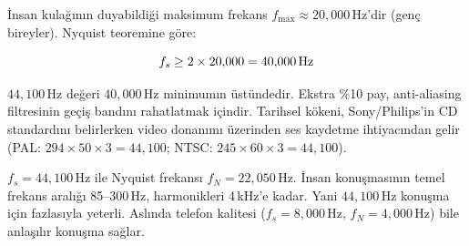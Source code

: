 \.{I}nsan kula\u{g}{\i}n{\i}n duyabildi\u{g}i maksimum frekans $f_{\max} \approx 20{,}000$\,Hz'dir (gen\c{c} bireyler). Nyquist teoremine g\"{o}re:

\begin{equation}
\label{eq:nyquist_audio}
f_s \geq 2 \times 20{,}000 = 40{,}000 \text{\,Hz}
\end{equation}

$44{,}100$\,Hz de\u{g}eri $40{,}000$\,Hz minimum{\i}n \"{u}st\"{u}ndedir. Ekstra \%10 pay, anti-aliasing filtresinin ge\c{c}i\c{s} band{\i}n{\i} rahatlatmak i\c{c}indir. Tarihsel k\"{o}keni, Sony/Philips'in CD standard{\i}n{\i} belirlerken video donan{\i}m{\i} \"{u}zerinden ses kaydetme ihtiyac{\i}ndan gelir (PAL: $294 \times 50 \times 3 = 44{,}100$; NTSC: $245 \times 60 \times 3 = 44{,}100$).

\begin{ornek}
$f_s = 44{,}100$\,Hz ile Nyquist frekans{\i} $f_N = 22{,}050$\,Hz. \.{I}nsan konu\c{s}mas{\i}n{\i}n temel frekans aral{\i}\u{g}{\i} 85--300\,Hz, harmonikleri 4\,kHz'e kadar. Yani $44{,}100$\,Hz konu\c{s}ma i\c{c}in fazlas{\i}yla yeterli. Asl{\i}nda telefon kalitesi ($f_s = 8{,}000$\,Hz, $f_N = 4{,}000$\,Hz) bile anla\c{s}{\i}l{\i}r konu\c{s}ma sa\u{g}lar.
\end{ornek}

